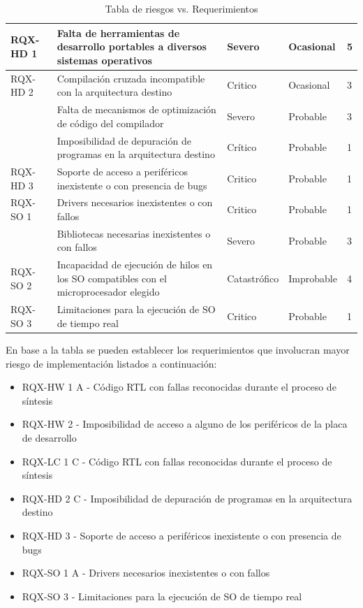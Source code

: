 \begin{table}[!h]
\begin{tabular}{ p{2.5cm} p{7.5cm} p{2cm} p{2cm} p{1.5cm} }
		\hline
		RQX-HD 1& Falta de herramientas de desarrollo portables a diversos sistemas operativos & Severo  &  Ocasional & 5\\
		\hline		
		RQX-HD 2& Compilación cruzada incompatible con la arquitectura destino  & Critico &  Ocasional & 3\\
		\hline
				& Falta de mecanismos de optimización de código del compilador  & Severo  &  Probable & 3\\
		\hline
				& Imposibilidad de depuración de programas en la arquitectura destino& Crítico  &  Probable & 1\\
		\hline
		RQX-HD 3& Soporte de acceso a periféricos inexistente o con presencia de bugs & Critico &  Probable & 1\\
		\hline
		RQX-SO 1& Drivers necesarios inexistentes o con fallos & Critico &  Probable & 1\\
		\hline
				& Bibliotecas necesarias inexistentes o con fallos & Severo &  Probable & 3\\
		\hline
		RQX-SO 2& Incapacidad de ejecución de hilos en los SO compatibles con el microprocesador elegido & Catastrófico & Improbable & 4\\
		\hline
		RQX-SO 3& Limitaciones para la ejecución de SO de tiempo real & Critico & Probable & 1\\
		\hline
		\end{tabular}
		\caption{Tabla de riesgos vs. Requerimientos}
		\label{tab:riegos}
		\end{table}
	
		En base a la tabla se pueden establecer los requerimientos que involucran mayor riesgo de implementación listados a continuación:
		
		\begin{itemize}
		    \item RQX-HW 1 A - Código RTL con fallas reconocidas durante el proceso de síntesis
		    \item RQX-HW 2   - Imposibilidad de acceso a alguno de los periféricos de la placa de desarrollo
			\item RQX-LC 1 C - Código RTL con fallas reconocidas durante el proceso de síntesis
			\item RQX-HD 2 C - Imposibilidad de depuración de programas en la arquitectura destino
			\item RQX-HD 3   - Soporte de acceso a periféricos inexistente o con presencia de bugs
			\item RQX-SO 1 A - Drivers necesarios inexistentes o con fallos
			\item RQX-SO 3   - Limitaciones para la ejecución de SO de tiempo real
	    \end{itemize}
	    
